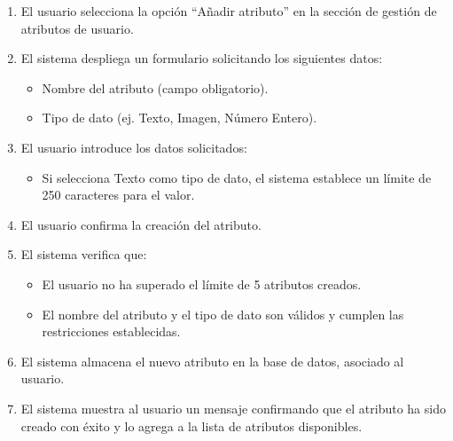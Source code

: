 \begin{enumerate}
    \item El usuario selecciona la opción “Añadir atributo” en la sección de gestión de atributos de usuario.
    \item El sistema despliega un formulario solicitando los siguientes datos:
    \begin{itemize}
        \item Nombre del atributo (campo obligatorio).
        \item Tipo de dato (ej. Texto, Imagen, Número Entero).
    \end{itemize}
    \item El usuario introduce los datos solicitados:
    \begin{itemize}
        \item Si selecciona Texto como tipo de dato, el sistema establece un límite de 250 caracteres para el valor.
    \end{itemize}
    \item El usuario confirma la creación del atributo.
    \item El sistema verifica que:
    \begin{itemize}
        \item El usuario no ha superado el límite de 5 atributos creados.
        \item El nombre del atributo y el tipo de dato son válidos y cumplen las restricciones establecidas.
    \end{itemize}
    \item El sistema almacena el nuevo atributo en la base de datos, asociado al usuario.
    \item El sistema muestra al usuario un mensaje confirmando que el atributo ha sido creado con éxito y lo agrega a la lista de atributos disponibles.
\end{enumerate}

